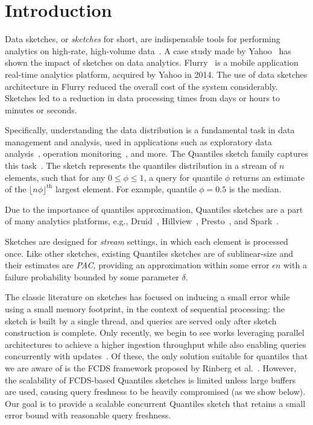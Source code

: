 \chapter{Introduction}
\label{chap:intro}

Data sketches, or \emph{sketches} for short, are indispensable tools for performing analytics on high-rate, high-volume data~\cite{KDD_tutorial}. A case study made by Yahoo~\cite{flurry_case} has shown the impact of sketches on data analytics. Flurry~\cite{flurry} is a mobile application real-time analytics platform, acquired by Yahoo in 2014. The use of data sketches architecture in Flurry reduced the overall cost of the system considerably. Sketches led to a reduction in data processing times from days or hours to minutes or seconds.

Specifically, understanding the data distribution is a fundamental task in data management and analysis, used in applications such as exploratory data analysis~\cite{vartak2015seedb}, operation monitoring~\cite{abraham2013scuba}, and more. The Quantiles sketch family captures this task~\cite{masson2019ddsketch, mergeables_summaries, gan2018moment, cormode2021relative}. The sketch represents the quantiles distribution in a stream of $n$ elements, such that for any $0 \leq \phi \leq 1$, a query for quantile $\phi$ returns an estimate of the $\lfloor n\phi \rfloor ^{\text{th}}$ largest element. For example, quantile $\phi=0.5$ is the median.

Due to the importance of quantiles approximation, Quantiles sketches are a part of many analytics platforms, e.g., Druid~\cite{druid-quantiles}, Hillview~\cite{budiu2019hillview}, Presto~\cite{presto}, and Spark~\cite{spark}.

Sketches are designed for \emph{stream} settings, in which each element is processed once. Like other sketches, existing Quantiles sketches are of sublinear-size and their estimates are \emph{\gls{PAC}}, providing an approximation within some error $\epsilon n$ with a failure probability bounded by some parameter $\delta$. 

The classic literature on sketches has focused on inducing a small error while using a small memory footprint, in the context of sequential processing: the sketch is built by a single thread, and queries are served only after sketch construction is complete. Only recently, we begin to see works leveraging parallel architectures to achieve a higher ingestion throughput while also enabling queries concurrently with updates~\cite{Rinberg_2020_fast_sketches, stylianopoulos2020delegation}. 
Of these, the only solution suitable for quantiles that we are aware of is the \acrfull{FCDS} framework proposed by Rinberg et al.~\cite{Rinberg_2020_fast_sketches}. However, the scalability of FCDS-based Quantiles sketches is limited unless large buffers are used, causing query freshness to be heavily compromised (as we show below). Our goal is to provide a scalable concurrent Quantiles sketch that retains a small error bound with reasonable query freshness.

